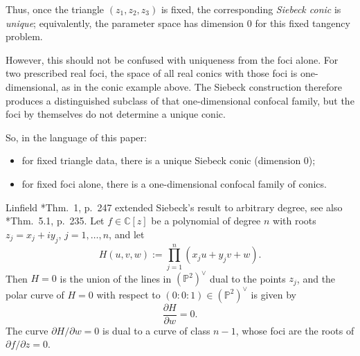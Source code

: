 \documentclass[11pt]{amsart}
\theoremstyle{definition}
\theoremstyle{remark}
\begin{document}
Thus, once the triangle $(z_1,z_2,z_3)$ is fixed, the corresponding \emph{Siebeck conic} is
\emph{unique}; equivalently, the parameter space has dimension $0$ 
for this fixed tangency problem.

However, this should not be confused with uniqueness from the foci alone. For two
prescribed real foci, the space of all real conics with those foci is one-dimensional, as
in the conic example above. The Siebeck construction therefore produces a distinguished
subclass of that one-dimensional confocal family, but the foci by themselves do not
determine a unique conic.

So, in the language of this paper:
\begin{itemize}
\item for fixed triangle data, there is a unique Siebeck conic (dimension $0$);
\item for fixed foci alone, there is a one-dimensional confocal family of conics.
\end{itemize}


Linfield \cite{Linfield}*{Thm.~1, p.~247} extended Siebeck's result to arbitrary degree, see also
\cite{CA2}*{Thm.~5.1, p.~235}. Let $f\in \mathbb C[z]$ be a polynomial of degree $n$ with roots
$z_j=x_j+iy_j$, $j=1,\dots,n$, and let
\[
H(u,v,w):=\prod_{j=1}^n (x_ju+y_jv+w).
\]
Then $H=0$ is the union of the lines in $(\mathbb P^2)^\vee$ dual to the points $z_j$,
and the polar curve of $H=0$ with respect to $(0:0:1)\in (\mathbb P^2)^\vee$ is given by
\[
\frac{\partial H}{\partial w}=0.
\]
The curve $\partial H/\partial w=0$ is dual to a curve of class $n-1$, whose foci are the
roots of $\partial f/\partial z=0$.
\end{document}
